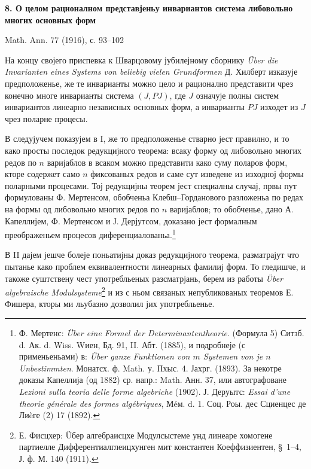 \documentclass[11pt]{article}
\begin{document}
\begin{center}
{\Large\bfseries 8. О целом рационалном представјеньу инвариантов система либовольно многих основных форм}\par
\vspace{1.2em}
Math. Ann. 77 (1916), с. 93--102
\end{center}

\vspace{1em}

На концу својего приспевка к Шварцовому јубилејному сборнику \emph{Über die Invarianten eines Systems von beliebig vielen Grundformen} Д. Хилберт изказује предположенье, же те инварианты можно цело и рационално представити чрез конечно многе инварианты система $(J,PJ)$, где $J$ означује полны систем инвариантов линеарно независных основных форм, а инварианты $PJ$ изходет из $J$ чрез поларне процесы.

В следујучем показујем в I, же то предположенье стварно јест правилно, и то како просты последок редукцијного теорема: всаку форму од либовольно многих редов по $n$ варијаблов в всаком можно представити како суму поларов форм, кторе содержет само $n$ фиксованых редов и саме сут изведене из изходној формы поларными процесами. Тој редукцијны теорем јест специалны случај, првы пут формулованы Ф. Мертенсом, обобченьа Клебш--Горданового разложеньа по редах на формы од либовольно многих редов по $n$ варијаблов; то обобченье, дано А. Капеллијем, Ф. Мертенсом и Ј. Дерјутсом, доказано јест формалным преображеньем процесов диференциалованьа.\footnote{Ф. Мертенс: \emph{Über eine Formel der Determinantentheorie}. (Формула 5) Ситзб. d. Ак. d. Wiss. Wиен, Бд. 91, II. Абт. (1885), и подробнеје (с применьеньами) в: \emph{Über ganze Funktionen von $m$ Systemen von je $n$ Unbestimmten}. Монатсх. ф. Math. у. Пхыс. 4. Јахрг. (1893). За некотре доказы Капеллија (од 1882) ср. напр.: Math. Анн. 37, или автографоване \emph{Lezioni sulla teoria delle forme algebriche} (1902). Ј. Деруытс: \emph{Essai d'une theorie générale des formes algébriques}, Мéм. d. 1. Соц. Роы. дес Сциенцес де Лиèге (2) 17 (1892).}

В II дајем јешче болеје поньатијны доказ редукцијного теорема, разматрајут что пытанье како проблем еквивалентности линеарных фамилиј форм. То гледишче, и такоже суштствену чест употребльеных разсматрјань, берем из работы \emph{Über algebraische Modulsysteme}\footnote{Е. Фисцхер: Üбер алгебраисцхе Модулсыстеме унд линеаре хомогене партиелле Дифферентиалглеицхунген мит константен Коеффизиентен, \S\ 1--4, Ј. ф. М. 140 (1911).} и из с ньом связаных непубликованых теоремов Е. Фишера, кторы ми льубазно дозволил јих употребльенье.
\end{document}
